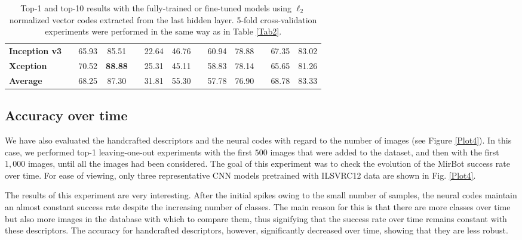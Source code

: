 \documentclass[final, twocolumn]{elsarticle}
\begin{document}
\begin{table*}
\begin{footnotesize}
\begin{tabular}{llccccccccccc}
\textbf{Inception v3} && 65.93                                     & 85.51                                    && 22.64              & 46.76             && 60.94                                        & 78.88                                        && 67.35                                      & 83.02                                      \\
\textbf{Xception}     && 70.52                                     & \textbf{88.88}                           && 25.31              & 45.11             && 58.83                                        & 78.14                                        && 65.65                                      & 81.26                                      \\ \hline
\textbf{Average}      && 68.25                                     & 87.30                                    && 31.81              & 55.30             && 57.78                                        & 76.90                                        && 68.78                                      & 83.33                                        \\ \hline
\end{tabular}
\end{footnotesize}
\caption{Top-1 and top-10 results with the fully-trained or fine-tuned models using $\ell_2$ normalized vector codes extracted from the last hidden layer. 5-fold cross-validation experiments were performed in the same way as in Table \ref{Tab2}.}
\label{tab:knn_from_dnn_train}
\end{table*}


\subsection{Accuracy over time}

We have also evaluated the handcrafted descriptors and the neural codes with regard to the number of images (see Figure \ref{Plot4}). In this case, we performed top-1 leaving-one-out experiments with the first $500$ images that were added to the dataset, and then with the first $1,000$ images, until all the images had been considered. The goal of this experiment was to check the evolution of the MirBot success rate over time. For ease of viewing, only three representative CNN models pretrained with ILSVRC12 data are shown in Fig. \ref{Plot4}.

The results of this experiment are very interesting. After the initial spikes owing to the small number of samples, the neural codes maintain an almost constant success rate despite the increasing number of classes. The main reason for this is that there are more classes over time but also more images in the database with which to compare them, thus signifying that the success rate over time remains constant with these descriptors. The accuracy for handcrafted descriptors, however, significantly decreased over time, showing that they are less robust.
\end{document}
